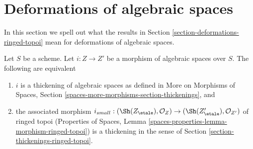 \section{Deformations of algebraic spaces}
\label{section-deformations-spaces}

\noindent
In this section we spell out what the results in
Section \ref{section-deformations-ringed-topoi}
mean for deformations of algebraic spaces.

\begin{lemma}
\label{lemma-match-thickenings}
Let $S$ be a scheme. Let $i : Z \to Z'$ be a morphism of algebraic spaces
over $S$. The following are equivalent
\begin{enumerate}
\item $i$ is a thickening of algebraic spaces as defined
in More on Morphisms of Spaces, Section
\ref{spaces-more-morphisms-section-thickenings}, and
\item the associated morphism
$i_{small} : (\Sh(Z_\etale), \mathcal{O}_Z) \to
(\Sh(Z'_\etale), \mathcal{O}_{Z'})$
of ringed topoi (Properties of Spaces, Lemma
\ref{spaces-properties-lemma-morphism-ringed-topoi})
is a thickening in the sense of
Section \ref{section-thickenings-ringed-topoi}.
\end{enumerate}
\end{lemma}

